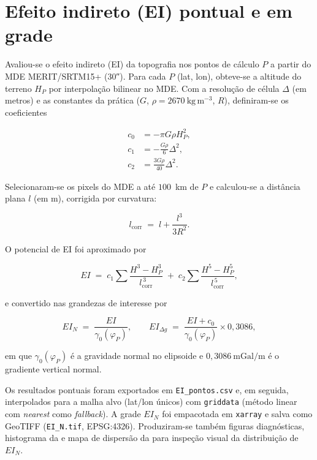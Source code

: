 \section{Efeito indireto (EI) pontual e em grade}

Avaliou-se o efeito indireto (EI) da topografia nos pontos de cálculo $P$ a partir do MDE MERIT/SRTM15+ (30″). Para cada $P$ (lat, lon), obteve-se a altitude do terreno $H_P$ por interpolação bilinear no MDE. Com a resolução de célula $\Delta$ (em metros) e as constantes da prática ($G$, $\rho=2670~\mathrm{kg\,m^{-3}}$, $R$), definiram-se os coeficientes

\begin{align}
    c_0 & = -\pi G\rho H_P^2, \\
    c_1 & = -\frac{G\rho}{6}\Delta^2, \\
    c_2 & = \frac{3G\rho}{40}\Delta^2.
\end{align}

Selecionaram-se os pixels do MDE a até $100$~km de $P$ e calculou-se a distância plana $l$ (em m), corrigida por curvatura:

\begin{equation}
    l_{\text{corr}} \;=\; l + \frac{l^3}{3R^2}.
\end{equation}

\noindent O potencial de EI foi aproximado por

\begin{equation}
    EI \;=\; c_1 \sum \frac{H^3 - H_P^3}{l_{\text{corr}}^{\,3}}
        \;+\; c_2 \sum \frac{H^5 - H_P^5}{l_{\text{corr}}^{\,5}},
\end{equation}

\noindent e convertido nas grandezas de interesse por

\begin{equation}
    EI_N \;=\; \frac{EI}{\gamma_0(\varphi_P)},\qquad
    EI_{\Delta g} \;=\; \frac{EI + c_0}{\gamma_0(\varphi_P)}\times 0{,}3086,
\end{equation}

\noindent em que $\gamma_0(\varphi_P)$ é a gravidade normal no elipsoide e $0{,}3086~\mathrm{mGal/m}$ é o gradiente vertical normal.

Os resultados pontuais foram exportados em \texttt{EI\allowbreak\_pontos.csv} e, em seguida, interpolados para a malha alvo (lat/lon únicos) com \texttt{griddata} (método linear com \emph{nearest} como \emph{fallback}). A grade $EI_N$ foi empacotada em \texttt{xarray} e salva como GeoTIFF (\texttt{EI\allowbreak\_N.tif}, EPSG:4326). Produziram-se também figuras diagnósticas, histograma da  e mapa de dispersão da  para inspeção visual da distribuição de $EI_N$.

